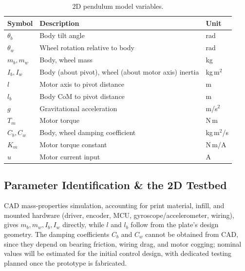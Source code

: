 \begin{table}[htbp]
\centering
\caption[2D pendulum model variables]{2D pendulum model variables.}
\label{tab:2d_vars}
\begin{tabular}{lll}
\toprule
Symbol & Description & Unit \\
\midrule
$\theta_b$ & Body tilt angle & rad \\
$\theta_w$ & Wheel rotation relative to body & rad \\
$m_b, m_w$ & Body, wheel mass & kg \\
$I_b, I_w$ & Body (about pivot), wheel (about motor axis) inertia & kg\,m$^2$ \\
$l$ & Motor axis to pivot distance & m \\
$l_b$ & Body CoM to pivot distance & m \\
$g$ & Gravitational acceleration & m/s$^2$ \\
$T_m$ & Motor torque & N\,m \\
$C_b, C_w$ & Body, wheel damping coefficient & kg\,m$^2$/s \\
$K_m$ & Motor torque constant & N\,m/A \\
$u$ & Motor current input & A \\
\bottomrule
\end{tabular}
\end{table}

\newpage
\subsection{Parameter Identification \& the 2D Testbed}
\label{sec:paramid}

CAD mass-properties simulation, accounting for print material, infill, and
mounted hardware (driver, encoder, MCU, gyroscope/accelerometer, wiring),
gives $m_b, m_w, I_b, I_w$ directly, while $l$ and $l_b$ follow from the
plate's design geometry. The damping coefficients $C_b$ and $C_w$ cannot be
obtained from CAD, since they depend on bearing friction, wiring drag, and
motor cogging; nominal values will be estimated for the initial control
design, with dedicated testing planned once the prototype is fabricated.


